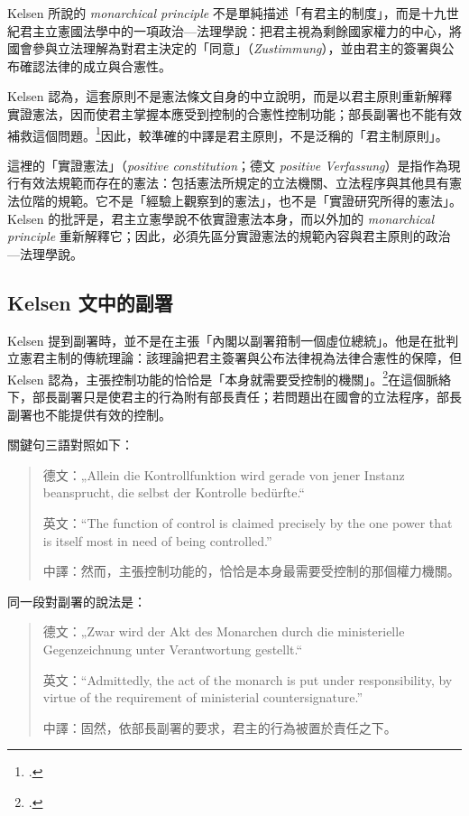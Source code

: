 Kelsen 所說的 \emph{monarchical principle} 不是單純描述「有君主的制度」，而是十九世紀君主立憲國法學中的一項政治---法理學說：把君主視為剩餘國家權力的中心，將國會參與立法理解為對君主決定的「同意」（\emph{Zustimmung}），並由君主的簽署與公布確認法律的成立與合憲性。

Kelsen 認為，這套原則不是憲法條文自身的中立說明，而是以君主原則重新解釋實證憲法，因而使君主掌握本應受到控制的合憲性控制功能；部長副署也不能有效補救這個問題。\footcites[25--27]{kelsen2015}[33--35]{kelsen1929}因此，較準確的中譯是君主原則，不是泛稱的「君主制原則」。

這裡的「實證憲法」（\emph{positive constitution}；德文 \emph{positive Verfassung}）是指作為現行有效法規範而存在的憲法：包括憲法所規定的立法機關、立法程序與其他具有憲法位階的規範。它不是「經驗上觀察到的憲法」，也不是「實證研究所得的憲法」。Kelsen 的批評是，君主立憲學說不依實證憲法本身，而以外加的 \emph{monarchical principle} 重新解釋它；因此，必須先區分實證憲法的規範內容與君主原則的政治---法理學說。

\subsection{Kelsen 文中的副署}

Kelsen 提到副署時，並不是在主張「內閣以副署箝制一個虛位總統」。他是在批判立憲君主制的傳統理論：該理論把君主簽署與公布法律視為法律合憲性的保障，但 Kelsen 認為，主張控制功能的恰恰是「本身就需要受控制的機關」。\footcites[26--27]{kelsen2015}[35]{kelsen1929}在這個脈絡下，部長副署只是使君主的行為附有部長責任；若問題出在國會的立法程序，部長副署也不能提供有效的控制。

關鍵句三語對照如下：

\begin{quote}
德文：„Allein die Kontrollfunktion wird gerade von jener Instanz beansprucht, die selbst der Kontrolle bedürfte.``

英文：``The function of control is claimed precisely by the one power that is itself most in need of being controlled.''

中譯：然而，主張控制功能的，恰恰是本身最需要受控制的那個權力機關。
\end{quote}

同一段對副署的說法是：

\begin{quote}
德文：„Zwar wird der Akt des Monarchen durch die ministerielle Gegenzeichnung unter Verantwortung gestellt.``

英文：``Admittedly, the act of the monarch is put under responsibility, by virtue of the requirement of ministerial countersignature.''

中譯：固然，依部長副署的要求，君主的行為被置於責任之下。
\end{quote}


